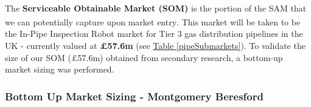\documentclass[11pt]{article}		%
\newcommand{\supercite}[1]{\textsuperscript{\cite{#1}}}		%
\newcommand{\tableref}[1]{\hyperref[#1]{Table \ref*{#1}}}     %
\begin{document}
        \\
        \hspace*{3ex}The \textbf{Serviceable Obtainable Market (SOM)} is the portion of the SAM that we can potentially capture upon market entry\supercite{tamsamsom}. This market will be taken to be the In-Pipe Inspection Robot market for Tier 3 gas distribution pipelines in the UK - currently valued at \textbf{£57.6m} (see \tableref{pipeSubmarkets}). To validate the size of our SOM (£57.6m) obtained from secondary research, a bottom-up market sizing was performed. 

    \subsubsection[Bottom Up Market Sizing]{Bottom Up Market Sizing - Montgomery Beresford} \label{bottomUp}
    
\end{document}
